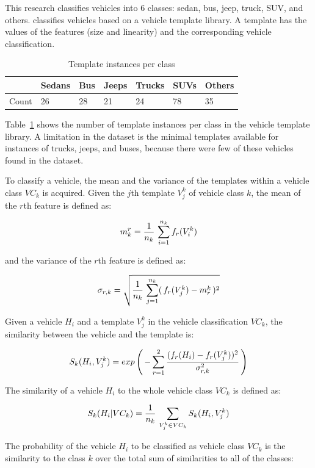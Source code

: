 \documentclass[conference]{IEEEtran}
\begin{document}
This research classifies vehicles into 6 classes: sedan, bus, jeep, truck, SUV, and others.  \cite{Jun-Wei} classifies vehicles based on a vehicle template library. A template has the values of the features (size and linearity) and the corresponding vehicle classification. 
\begin{table}[]
\centering
\caption{Template instances per class}
\label{template_instances}
\begin{tabular}{|l|l|l|l|l|l|l|}
\hline
       & Sedans & Bus & Jeeps & Trucks & SUVs & Others \\ \hline
Count  & 26     & 28  & 21    & 24     & 78   & 35     \\ \hline
\end{tabular}
\end{table}

Table~\ref{template_instances} shows the number of template instances per class in the vehicle template library. A limitation in the dataset is the minimal templates available for instances of trucks, jeeps, and buses, because there were few of these vehicles found in the dataset.

To classify a vehicle, the mean and the variance of the templates within a vehicle class $VC_k$ is acquired. Given the $j$th template $V_j^k$ of vehicle class $k$, the mean of the $r$th feature is defined as:

$$
m_k^r = \frac{1}{n_k} \thinspace \sum_{i=1}^{n_k} f_r (V_i^k)
$$

and the variance of the $r$th feature is defined as:

$$
\sigma_{r,k} = \sqrt{ \frac{1}{n_k} \thinspace \sum_{j=1}^{n_k} ( \thinspace f_r (V_j^k) - m_r^k \thinspace ) ^2 }
$$

Given a vehicle $H_i$ and a template $V_j^k$ in the vehicle classification $VC_k$, the similarity between the vehicle and the template is:

$$
S_k (H_i, V_j^k) = exp \left( \thinspace - \sum_{r=1}^{2} \frac{ (f_r(H_i) - f_r(V_j^k) )^2 }{\sigma_{r, k}^2 } \thinspace \right)
$$

The similarity of a vehicle $H_i$ to the whole vehicle class $VC_k$ is defined as:

$$
S_k (H_i | VC_k) = \frac{1}{n_k} \thinspace \sum_{V_j^k \in VC_k } S_k (H_i, V_j^k)
$$

The probability of the vehicle $H_i$ to be classified as vehicle class $VC_k$ is the similarity to the class $k$ over the total sum of similarities to all of the classes:
\end{document}

